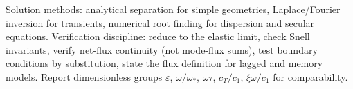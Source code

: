 \begin{summarybox}[Summary]
Solution methods: analytical separation for simple geometries, Laplace/Fourier inversion for transients, numerical root finding for dispersion and secular equations. Verification discipline: reduce to the elastic limit, check Snell invariants, verify net-flux continuity (not mode-flux sums), test boundary conditions by substitution, state the flux definition for lagged and memory models. Report dimensionless groups $\varepsilon$, $\omega/\omega_*$, $\omega\tau$, $c_T/c_1$, $\xi\omega/c_1$ for comparability.
\end{summarybox}